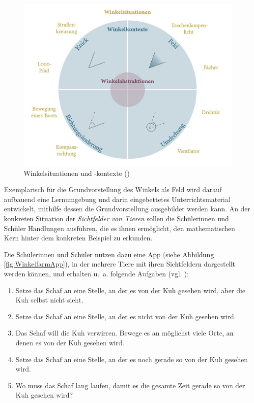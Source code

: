 \documentclass[
]{scrbook}
\providecommand{\tightlist}{%
  \setlength{\itemsep}{0pt}\setlength{\parskip}{0pt}}
\theoremstyle{definition}
\theoremstyle{definition}
\theoremstyle{definition}
\theoremstyle{definition}
\theoremstyle{remark}
\begin{document}
\begin{figure}

{\centering \includegraphics[width=0.75\linewidth]{pictures/1-Winkelsituationen} 

}

\caption{Winkelsituationen und -kontexte ()}\label{fig:Winkelsituationen}
\end{figure}

Exemplarisch für die Grundvorstellung des Winkels als Feld wird darauf aufbauend eine Lernumgebung und darin eingebettetes Unterrichtsmaterial entwickelt, mithilfe dessen die Grundvorstellung ausgebildet werden kann. An der konkreten Situation der \emph{Sichtfelder von Tieren} sollen die Schülerinnen und Schüler Handlungen ausführen, die es ihnen ermöglicht, den mathematischen Kern hinter dem konkreten Beispiel zu erkunden.

Die Schülerinnen und Schüler nutzen dazu eine App (siehe Abbildung \ref{fig:WinkelfarmApp}), in der mehrere Tiere mit ihren Sichtfeldern dargestellt werden können, und erhalten u.~a. folgende Aufgaben (vgl. ):

\begin{enumerate}
\def\labelenumi{\arabic{enumi}.}
\tightlist
\item
  Setze das Schaf an eine Stelle, an der es von der Kuh gesehen wird, aber die Kuh selbst nicht sieht.
\item
  Setze das Schaf an eine Stelle, an der es nicht von der Kuh gesehen wird.
\item
  Das Schaf will die Kuh verwirren. Bewege es an möglichst viele Orte, an denen es von der Kuh gesehen wird.
\item
  Setze das Schaf an eine Stelle, an der es noch gerade so von der Kuh gesehen wird.
\item
  Wo muss das Schaf lang laufen, damit es die gesamte Zeit gerade so von der Kuh gesehen wird?
\end{enumerate}
\end{document}

